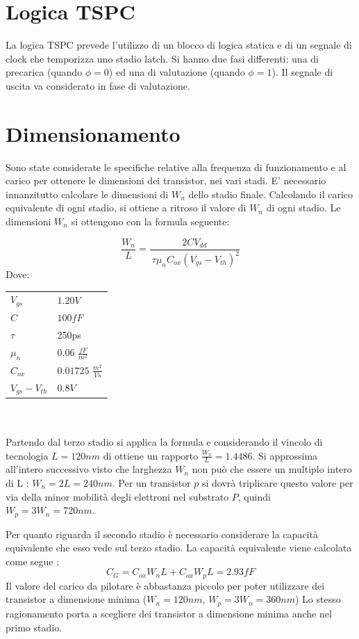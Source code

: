 \documentclass[11pt]{article} %
\begin{document}
\section{Logica TSPC}
La logica TSPC prevede l'utilizzo di un blocco di logica statica e di un segnale di clock che temporizza uno stadio latch. Si hanno due fasi differenti: una di precarica (quando $\phi=0$) ed una di valutazione (quando $\phi=1$). Il segnale di uscita va considerato in fase di valutazione.

\section{Dimensionamento}
Sono state considerate le specifiche relative alla frequenza di funzionamento e al carico per ottenere le dimensioni dei transistor, nei vari stadi.  
E' necessario innanzitutto calcolare le dimensioni di $W_{n}$ dello stadio finale. Calcolando il carico equivalente di ogni stadio, si ottiene a ritroso il valore di $W_{n}$ di ogni stadio.
Le dimensioni $W_{n}$ si ottengono con la formula seguente:

\begin{equation} 
\frac{W_{n}}{L}=\frac{2CV_{dd}}{\
 \tau \mu_{n}C_{ox}(V_{gs}-V_{th})^2}
\end{equation}
Dove:\mbox{}\\

\begin{tabular}{|ll|}
\hline
$V_{gs}$ & $1.20V$ \\
$C$ & $100fF$ \\
$\tau$ & 250ps\\
$\mu_{n}$ & $0.06$  $\frac{fF}{m^2}$  \\
$C_{ox}$ & $0.01725$ $\frac{m^2}{Vs}$  \\
$V_{gs} - V_{th}$ & $0.8V$ \\
\hline
\end{tabular}
\mbox{}\\
\\
Partendo dal terzo stadio si applica la formula e considerando il vincolo di tecnologia $L= 120 nm$ di ottiene un rapporto $\frac {W_{n}}{L}= 1.4486$.
Si approssima all'intero successivo visto che larghezza  $W_{n}$ non può che essere un multiplo intero di L :   $W_{n}=2L= 240nm$.
Per un transistor $p$ si dovrà triplicare questo valore per via della minor mobilità degli elettroni nel substrato $P$, quindi $W_{p}=3W_{n}= 720nm$.

Per quanto riguarda il secondo stadio è necessario considerare la capacità equivalente che esso vede sul terzo stadio.
La capacità equivalente viene calcolata come segue :
\begin{equation}
C_{G}= C_{ox}W_{n}L+C_{ox}W_{p}L= 2.93fF
\end{equation}
Il valore del carico da pilotare è abbastanza piccolo per poter utilizzare dei transistor a dimensione minima ($W_{n}=120 nm$, $W_{p}=3W_{n}= 360nm$)
Lo stesso ragionamento porta a scegliere dei transistor a dimensione minima anche nel primo stadio. 
\end{document}
